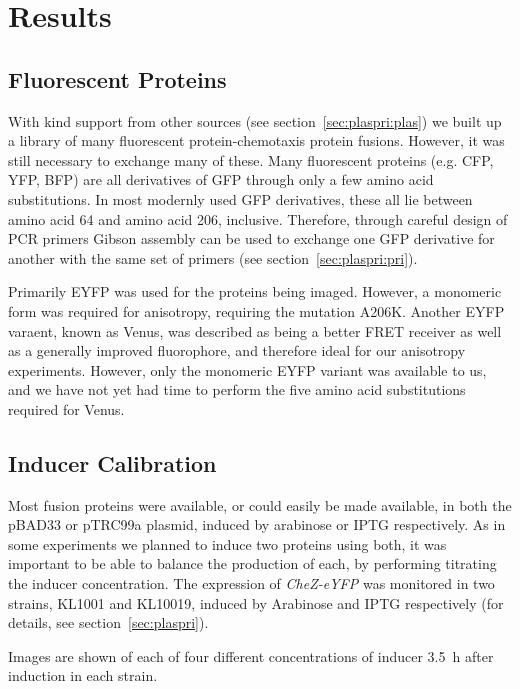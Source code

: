 \documentclass[../main.tex]{subfiles}
\begin{document}
\section{Results}


\subsection{Fluorescent Proteins}

With kind support from other sources (see section~\ref{sec:plaspri:plas}) we built up a library of many fluorescent protein-chemotaxis protein fusions. However, it was still necessary to exchange many of these. Many fluorescent proteins (e.g. CFP, YFP, BFP) are all derivatives of GFP through only a few amino acid substitutions\citep{tsien98}. In most modernly used GFP derivatives, these all lie between amino acid 64 and amino acid 206, inclusive. Therefore, through careful design of PCR primers Gibson assembly can be used to exchange one GFP derivative for another with the same set of primers (see section~\ref{sec:plaspri:pri}).

Primarily EYFP was used for the proteins being imaged. However, a monomeric form was required for anisotropy\citep{vaknin07}, requiring the mutation A206K. Another EYFP varaent, known as Venus, was described as being a better FRET receiver\citep{nagai02} as well as a generally improved fluorophore, and therefore ideal for our anisotropy experiments. However, only the monomeric EYFP variant was available to us, and we have not yet had time to perform the five amino acid substitutions required for Venus.

\subsection{Inducer Calibration}

Most fusion proteins were available, or could easily be made available, in both the pBAD33 or pTRC99a plasmid, induced by arabinose or IPTG respectively. As in some experiments we planned to induce two proteins using both, it was important to be able to balance the production of each, by performing titrating the inducer concentration. The expression of \textsl{CheZ-eYFP} was monitored in two strains, KL1001 and KL10019, induced by Arabinose and IPTG respectively (for details, see section~\ref{sec:plaspri}).

Images are shown of each of four different concentrations of inducer \SI{3.5}{\hour} after induction in each strain.
\end{document}
